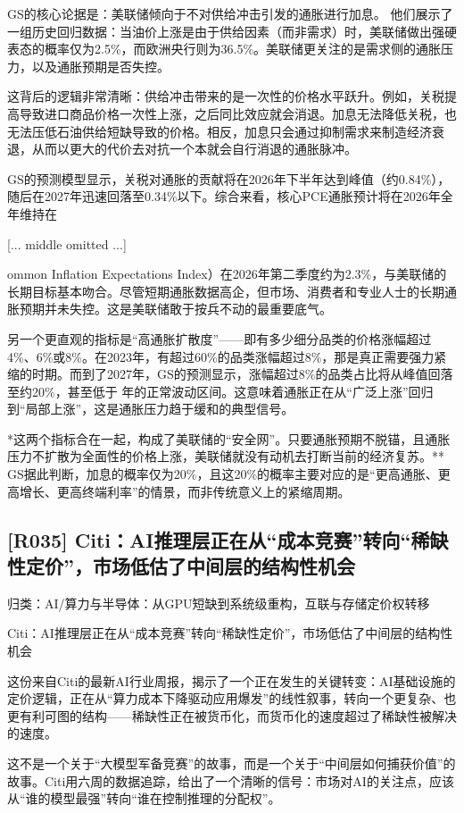\documentclass[11pt]{ctexart}
\begin{document}
GS的核心论据是：美联储倾向于不对供给冲击引发的通胀进行加息。 他们展示了一组历史回归数据：当油价上涨是由于供给因素（而非需求）时，美联储做出强硬表态的概率仅为2.5\%，而欧洲央行则为36.5\%。美联储更关注的是需求侧的通胀压力，以及通胀预期是否失控。

这背后的逻辑非常清晰：供给冲击带来的是一次性的价格水平跃升。例如，关税提高导致进口商品价格一次性上涨，之后同比效应就会消退。加息无法降低关税，也无法压低石油供给短缺导致的价格。相反，加息只会通过抑制需求来制造经济衰退，从而以更大的代价去对抗一个本就会自行消退的通胀脉冲。

GS的预测模型显示，关税对通胀的贡献将在2026年下半年达到峰值（约0.84\%），随后在2027年迅速回落至0.34\%以下。综合来看，核心PCE通胀预计将在2026年全年维持在

[... middle omitted ...]

ommon Inflation Expectations Index）在2026年第二季度约为2.3\%，与美联储的长期目标基本吻合。尽管短期通胀数据高企，但市场、消费者和专业人士的长期通胀预期并未失控。这是美联储敢于按兵不动的最重要底气。

另一个更直观的指标是“高通胀扩散度”——即有多少细分品类的价格涨幅超过4\%、6\%或8\%。在2023年，有超过60\%的品类涨幅超过8\%，那是真正需要强力紧缩的时期。而到了2027年，GS的预测显示，涨幅超过8\%的品类占比将从峰值回落至约20\%，甚至低于 年的正常波动区间。这意味着通胀正在从“广泛上涨”回归到“局部上涨”，这是通胀压力趋于缓和的典型信号。

*这两个指标合在一起，构成了美联储的“安全网”。只要通胀预期不脱锚，且通胀压力不扩散为全面性的价格上涨，美联储就没有动机去打断当前的经济复苏。** GS据此判断，加息的概率仅为20\%，且这20\%的概率主要对应的是“更高通胀、更高增长、更高终端利率”的情景，而非传统意义上的紧缩周期。

\subsection{[R035] Citi：AI推理层正在从“成本竞赛”转向“稀缺性定价”，市场低估了中间层的结构性机会}
{\small\color{refgray}归类：AI/算力与半导体：从GPU短缺到系统级重构，互联与存储定价权转移}

Citi：AI推理层正在从“成本竞赛”转向“稀缺性定价”，市场低估了中间层的结构性机会

这份来自Citi的最新AI行业周报，揭示了一个正在发生的关键转变：AI基础设施的定价逻辑，正在从“算力成本下降驱动应用爆发”的线性叙事，转向一个更复杂、也更有利可图的结构——稀缺性正在被货币化，而货币化的速度超过了稀缺性被解决的速度。

这不是一个关于“大模型军备竞赛”的故事，而是一个关于“中间层如何捕获价值”的故事。Citi用六周的数据追踪，给出了一个清晰的信号：市场对AI的关注点，应该从“谁的模型最强”转向“谁在控制推理的分配权”。
\end{document}
